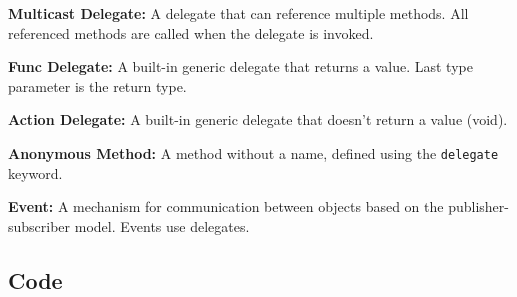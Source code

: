\documentclass[10pt,a4paper]{article}
\begin{document}
\textbf{Multicast Delegate:} A delegate that can reference multiple methods. All referenced methods are called when the delegate is invoked.

\textbf{Func Delegate:} A built-in generic delegate that returns a value. Last type parameter is the return type.

\textbf{Action Delegate:} A built-in generic delegate that doesn't return a value (void).

\textbf{Anonymous Method:} A method without a name, defined using the \texttt{delegate} keyword.

\textbf{Event:} A mechanism for communication between objects based on the publisher-subscriber model. Events use delegates.

\subsection*{Code}
\end{document}
